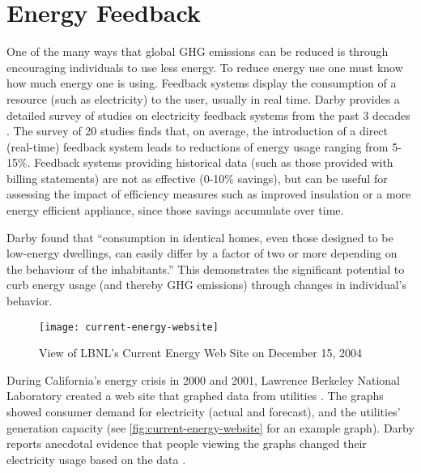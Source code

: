 \section{Energy Feedback}

One of the many ways that global GHG emissions can be reduced is through encouraging individuals to use less energy. To reduce energy use one must know how much energy one is using. Feedback systems display the consumption of a resource (such as electricity) to the user, usually in real time. Darby provides a detailed survey of studies on electricity feedback systems from the past 3 decades \cite{darby-review-2006}. The survey of 20 studies finds that, on average, the introduction of a direct (real-time) feedback system leads to reductions of energy usage ranging from 5-15\%. Feedback systems providing historical data (such as those provided with billing statements) are not as effective (0-10\% savings), but can be useful for assessing the impact of efficiency measures such as improved insulation or a more energy efficient appliance, since those savings accumulate over time.

Darby found that ``consumption in identical homes, even those designed to be low-energy dwellings, can easily differ by a factor of two or more depending on the behaviour of the inhabitants.'' This demonstrates the significant potential to curb energy usage (and thereby GHG emissions) through changes in individual's behavior.

\begin{figure}[htbp]
	\begin{center}
		\texttt{[image: current-energy-website]}
		\caption{View of LBNL's Current Energy Web Site on December 15, 2004}
		\label{fig:current-energy-website}
 	\end{center}
\end{figure}

During California's energy crisis in 2000 and 2001, Lawrence Berkeley National Laboratory created a web site that graphed data from utilities \cite{Bartholomew2008Current-Energy}. The graphs showed consumer demand for electricity (actual and forecast), and the utilities' generation capacity (see \autoref{fig:current-energy-website} for an example graph). Darby reports anecdotal evidence that people viewing the graphs changed their electricity usage based on the data \cite{darby-review-2006}.


